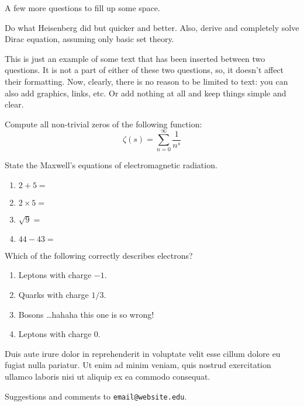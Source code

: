 \documentclass[11pt]{noether}
\begin{document}
A few more questions to fill up some space.

\begin{nquest}
  Do what Heisenberg did but quicker and better. Also, derive and completely solve Dirac equation, assuming only basic set theory. 
\end{nquest}

This is just an example of some text that has been inserted between two questions. It is not a part of either of these two questions, so, it doesn't affect their formatting. Now, clearly, there is no reason to be limited to text: you can also add graphics, links, etc. Or add nothing at all and keep things simple and clear.

\begin{nquest*}
  Compute all non-trivial zeros of the following function:
  \begin{equation*}
    \zeta(s) = \sum_{n=0}^{\infty} \frac{1}{n^s}
  \end{equation*} 
\end{nquest*}

\begin{nquest}
  State the Maxwell's equations of electromagnetic radiation.
\end{nquest}

\begin{nquest}
  \begin{enumerate}
    \item $2 + 5 =$
    \item $2 \times 5 =$
    \item $\sqrt{9} =$
    \item $44 - 43 = $
  \end{enumerate}
\end{nquest}

\begin{nquest*}
  Which of the following correctly describes electrons?
  \begin{enumerate}
    \item Leptons with charge $-1$.
    \item Quarks with charge $1/3$.
    \item Bosons \dots hahaha this one is so wrong!
    \item Leptons with charge $0$.
  \end{enumerate}
\end{nquest*}

Duis aute irure dolor in reprehenderit in voluptate velit esse cillum dolore eu fugiat nulla pariatur. Ut enim ad minim veniam, quis nostrud exercitation ullamco laboris nisi ut aliquip ex ea commodo consequat.

\begin{signature}
Suggestions and comments to \texttt{email@website.edu}.
\end{signature}
\end{document}
